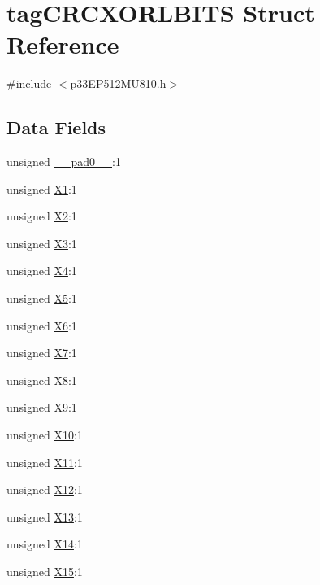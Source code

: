 \hypertarget{structtag_c_r_c_x_o_r_l_b_i_t_s}{}\section{tag\+C\+R\+C\+X\+O\+R\+L\+B\+I\+TS Struct Reference}
\label{structtag_c_r_c_x_o_r_l_b_i_t_s}


{\ttfamily \#include $<$p33\+E\+P512\+M\+U810.\+h$>$}

\subsection*{Data Fields}
\begin{DoxyCompactItemize}
\item 
unsigned \hyperlink{structtag_c_r_c_x_o_r_l_b_i_t_s_adf71f3d8410c1f1dbbc96680a92c49af}{\+\_\+\+\_\+pad0\+\_\+\+\_\+}\+:1
\item 
unsigned \hyperlink{structtag_c_r_c_x_o_r_l_b_i_t_s_a4f668a5aa0df43e03f3289327adcdc82}{X1}\+:1
\item 
unsigned \hyperlink{structtag_c_r_c_x_o_r_l_b_i_t_s_a0c092e1a3d7ec9888492dfb6e48e5b83}{X2}\+:1
\item 
unsigned \hyperlink{structtag_c_r_c_x_o_r_l_b_i_t_s_a82453a300a8438bb62c0c6a6f08cc17a}{X3}\+:1
\item 
unsigned \hyperlink{structtag_c_r_c_x_o_r_l_b_i_t_s_aff75d52ef39969a0d6222b74001b81dc}{X4}\+:1
\item 
unsigned \hyperlink{structtag_c_r_c_x_o_r_l_b_i_t_s_a8fb4df1dd5a2639fb98d609a2f60b2d3}{X5}\+:1
\item 
unsigned \hyperlink{structtag_c_r_c_x_o_r_l_b_i_t_s_a8dd05db0297565e8c13d63b3efa291c9}{X6}\+:1
\item 
unsigned \hyperlink{structtag_c_r_c_x_o_r_l_b_i_t_s_a49d501dde5b70cca653057be1c3d965f}{X7}\+:1
\item 
unsigned \hyperlink{structtag_c_r_c_x_o_r_l_b_i_t_s_a1ee0e7fff1523e34a25864fa8f8cb814}{X8}\+:1
\item 
unsigned \hyperlink{structtag_c_r_c_x_o_r_l_b_i_t_s_ad1f37b081fa694c3d410236a636af0db}{X9}\+:1
\item 
unsigned \hyperlink{structtag_c_r_c_x_o_r_l_b_i_t_s_a14ddbbc95dcd7c39f193942a1e2bb8bd}{X10}\+:1
\item 
unsigned \hyperlink{structtag_c_r_c_x_o_r_l_b_i_t_s_a8ef122f140c33391746c1a4c2c63d72d}{X11}\+:1
\item 
unsigned \hyperlink{structtag_c_r_c_x_o_r_l_b_i_t_s_a6d7671c1994279edd1e5cc0548821fe3}{X12}\+:1
\item 
unsigned \hyperlink{structtag_c_r_c_x_o_r_l_b_i_t_s_ae2b938dd4e8e6f8ddeb70f11831c646f}{X13}\+:1
\item 
unsigned \hyperlink{structtag_c_r_c_x_o_r_l_b_i_t_s_a5943319924b65021df8b9cb5f82c1faf}{X14}\+:1
\item 
unsigned \hyperlink{structtag_c_r_c_x_o_r_l_b_i_t_s_aa8cdf8c73c14c7216a2fd44121ba4757}{X15}\+:1
\end{DoxyCompactItemize}


